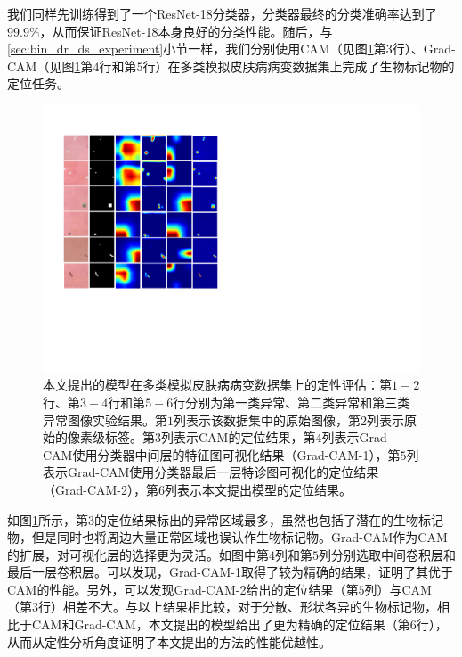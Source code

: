 我们同样先训练得到了一个ResNet-18分类器，分类器最终的分类准确率达到了$99.9\%$，从而保证ResNet-18本身良好的分类性能。随后，与\ref{sec:bin_dr_ds_experiment}小节一样，我们分别使用CAM（见图\ref{fig:multi_simulated_skin_res}第$3$行）、Grad-CAM（见图\ref{fig:multi_simulated_skin_res}第$4$行和第$5$行）在多类模拟皮肤病病变数据集上完成了生物标记物的定位任务。
\begin{figure}[h]
	\centering
	\includegraphics[width=1.0\textwidth]{figure/multi_simulated_skin_res.pdf}
	\caption{本文提出的模型在多类模拟皮肤病病变数据集上的定性评估：第$1-2$行、第$3-4$行和第$5-6$行分别为第一类异常、第二类异常和第三类异常图像实验结果。第$1$列表示该数据集中的原始图像，第$2$列表示原始的像素级标签。第$3$列表示CAM的定位结果，第$4$列表示Grad-CAM使用分类器中间层的特征图可视化结果（Grad-CAM-1），第$5$列表示Grad-CAM使用分类器最后一层特诊图可视化的定位结果（Grad-CAM-2），第$6$列表示本文提出模型的定位结果。}
	\label{fig:multi_simulated_skin_res}
\end{figure}

如图\ref{fig:multi_simulated_skin_res}所示，第$3$的定位结果标出的异常区域最多，虽然也包括了潜在的生物标记物，但是同时也将周边大量正常区域也误认作生物标记物。Grad-CAM作为CAM的扩展，对可视化层的选择更为灵活。如图中第$4$列和第$5$列分别选取中间卷积层和最后一层卷积层。可以发现，Grad-CAM-1取得了较为精确的结果，证明了其优于CAM的性能。另外，可以发现Grad-CAM-2给出的定位结果（第$5$列）与CAM（第$3$行）相差不大。与以上结果相比较，对于分散、形状各异的生物标记物，相比于CAM和Grad-CAM，本文提出的模型给出了更为精确的定位结果（第$6$行），从而从定性分析角度证明了本文提出的方法的性能优越性。


